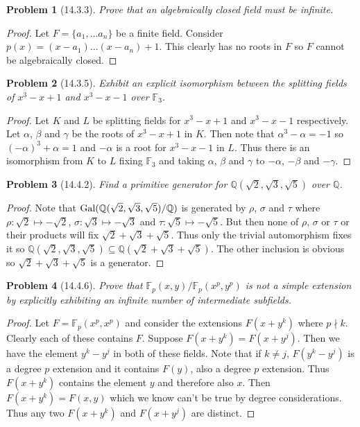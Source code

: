 \documentclass{article}
\newcommand{\gal}{\textup{Gal}}
\newtheorem{problem}{Problem}
\begin{document}

\begin{problem}[14.3.3]
Prove that an algebraically closed field must be infinite.
\end{problem}
\begin{proof}
Let $F = \{a_1, \dots a_n\}$ be a finite field. Consider $p(x) = (x-a_1) \dots (x-a_n) + 1$. This clearly has no roots in $F$ so $F$ cannot be algebraically closed.
\end{proof}

\begin{problem}[14.3.5]
Exhibit an explicit isomorphism between the splitting fields of $x^3-x+1$ and $x^3-x-1$ over $\mathbb{F}_3$.
\end{problem}
\begin{proof}
Let $K$ and $L$ be splitting fields for $x^3-x+1$ and $x^3-x-1$ respectively. Let $\alpha$, $\beta$ and $\gamma$ be the roots of $x^3-x+1$ in $K$. Then note that $\alpha^3 - \alpha = -1$ so $(-\alpha)^3 + \alpha = 1$ and $-\alpha$ is a root for $x^3-x-1$ in $L$. Thus there is an isomorphism from $K$ to $L$ fixing $\mathbb{F}_3$ and taking $\alpha$, $\beta$ and $\gamma$ to $-\alpha$, $-\beta$ and $-\gamma$.
\end{proof}

\begin{problem}[14.4.2]
Find a primitive generator for $\mathbb{Q}(\sqrt{2}, \sqrt{3}, \sqrt{5})$ over $\mathbb{Q}$.
\end{problem}
\begin{proof}
Note that $\gal(\mathbb{Q}(\sqrt{2}, \sqrt{3}, \sqrt{5})/\mathbb{Q})$ is generated by $\rho$, $\sigma$ and $\tau$ where $\rho : \sqrt{2} \mapsto -\sqrt{2}$, $\sigma : \sqrt{3} \mapsto -\sqrt{3}$ and $\tau : \sqrt{5} \mapsto -\sqrt{5}$. But then none of $\rho$, $\sigma$ or $\tau$ or their products will fix $\sqrt{2} + \sqrt{3} + \sqrt{5}$. Thus only the trivial automorphism fixes it so $\mathbb{Q}(\sqrt{2}, \sqrt{3}, \sqrt{5}) \subseteq \mathbb{Q}(\sqrt{2} + \sqrt{3} + \sqrt{5})$. The other inclusion is obvious so $\sqrt{2} + \sqrt{3} + \sqrt{5}$ is a generator.
\end{proof}

\begin{problem}[14.4.6]
Prove that $\mathbb{F}_p(x,y)/\mathbb{F}_p(x^p,y^p)$ is not a simple extension by explicitly exhibiting an infinite number of intermediate subfields.
\end{problem}
\begin{proof}
Let $F = \mathbb{F}_p(x^p,x^p)$ and consider the extensions $F(x+y^k)$ where $p \nmid k$. Clearly each of these contains $F$. Suppose $F(x+y^k) = F(x+y^j)$. Then we have the element $y^k-y^j$ in both of these fields. Note that if $k \neq j$, $F(y^k-y^j)$ is a degree $p$ extension and it contains $F(y)$, also a degree $p$ extension. Thus $F(x+y^k)$ contains the element $y$ and therefore also $x$. Then $F(x+y^k) = F(x,y)$ which we know can't be true by degree considerations. Thus any two $F(x+y^k)$ and $F(x+y^j)$ are distinct.
\end{proof}
\end{document}
